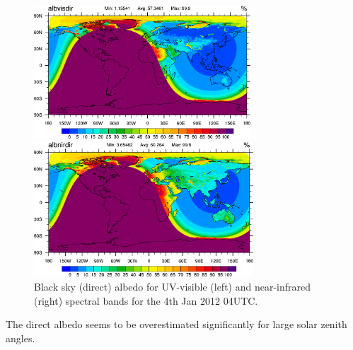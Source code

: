 \documentclass[a4paper,11pt]{article}
\begin{document}
\begin{figure}[hbt]
\begin{minipage}[t]{\textwidth}
  \begin{minipage}[t]{0.498\textwidth}
    \center
    \includegraphics[width=8.1cm]{albvisdir_20120601_blacksky_ritter.png}
  \end{minipage}
  \begin{minipage}[t]{0.498\textwidth}
    \center
    \includegraphics[width=8.2cm]{albnirdir_20120601_blacksky_ritter.png}
  \end{minipage}
\end{minipage}
\caption{Black sky (direct) albedo for UV-visible (left) and near-infrared (right) spectral bands for the 4th Jan 2012 04UTC.}\label{fig_albdir}
\end{figure}
The direct albedo seems to be overestimated significantly for large solar zenith angles.
\end{document}
